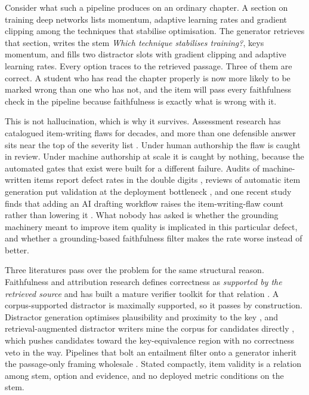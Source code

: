 \documentclass[11pt]{article}
\begin{document}
Consider what such a pipeline produces on an ordinary chapter. A section on training deep networks lists momentum, adaptive learning rates and gradient clipping among the techniques that stabilise optimisation. The generator retrieves that section, writes the stem \emph{Which technique stabilises training?}, keys momentum, and fills two distractor slots with gradient clipping and adaptive learning rates. Every option traces to the retrieved passage. Three of them are correct. A student who has read the chapter properly is now more likely to be marked wrong than one who has not, and the item will pass every faithfulness check in the pipeline because faithfulness is exactly what is wrong with it.

This is not hallucination, which is why it survives. Assessment research has catalogued item-writing flaws for decades, and more than one defensible answer sits near the top of the severity list \citep{rezigalla2024item,tarrant2006frequency,liu2023multiplechoice}. Under human authorship the flaw is caught in review. Under machine authorship at scale it is caught by nothing, because the automated gates that exist were built for a different failure. Audits of machine-written items report defect rates in the double digits \citep{grevisse2024docimological,doughty2024comparative,kyak2026validity}, reviews of automatic item generation put validation at the deployment bottleneck \citep{tan2025review,falcao2022feasibility}, and one recent study finds that adding an AI drafting workflow raises the item-writing-flaw count rather than lowering it \citep{automation2026bias}. What nobody has asked is whether the grounding machinery meant to improve item quality is implicated in this particular defect, and whether a grounding-based faithfulness filter makes the rate worse instead of better.

Three literatures pass over the problem for the same structural reason. Faithfulness and attribution research defines correctness as \emph{supported by the retrieved source} and has built a mature verifier toolkit for that relation \citep{honovich2022true,laban2022summac,es2024ragas,saadfalcon2024ares}. A corpus-supported distractor is maximally supported, so it passes by construction. Distractor generation optimises plausibility and proximity to the key \citep{alhazmi2024distractor,awalurahman2024automatic,ren2021knowledgedriven}, and retrieval-augmented distractor writers mine the corpus for candidates directly \citep{yu2024enhancing}, which pushes candidates toward the key-equivalence region with no correctness veto in the way. Pipelines that bolt an entailment filter onto a generator inherit the passage-only framing wholesale \citep{lei2023chain,wu2024synchronous}. Stated compactly, item validity is a relation among stem, option and evidence, and no deployed metric conditions on the stem.
\end{document}
